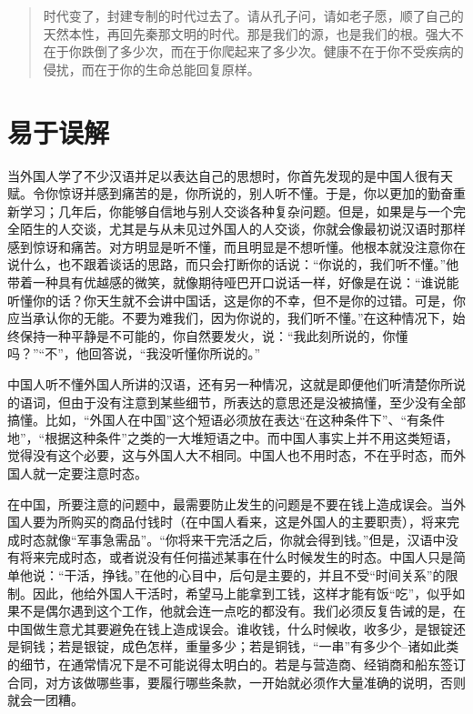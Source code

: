 \documentclass[12pt,oneside]{book}
\begin{document}
\begin{common-format}
\begin{quotation}
时代变了，封建专制的时代过去了。请从孔子问，请如老子愿，顺了自己的天然本性，再回先秦那文明的时代。那是我们的源，也是我们的根。强大不在于你跌倒了多少次，而在于你爬起来了多少次。健康不在于你不受疾病的侵扰，而在于你的生命总能回复原样。
\end{quotation}


\chapter{易于误解}
当外国人学了不少汉语并足以表达自己的思想时，你首先发现的是中国人很有天赋。令你惊讶并感到痛苦的是，你所说的，别人听不懂。于是，你以更加的勤奋重新学习；几年后，你能够自信地与别人交谈各种复杂问题。但是，如果是与一个完全陌生的人交谈，尤其是与从未见过外国人的人交谈，你就会像最初说汉语时那样感到惊讶和痛苦。对方明显是听不懂，而且明显是不想听懂。他根本就没注意你在说什么，也不跟着谈话的思路，而只会打断你的话说：“你说的，我们听不懂。”他带着一种具有优越感的微笑，就像期待哑巴开口说话一样，好像是在说：“谁说能听懂你的话？你天生就不会讲中国话，这是你的不幸，但不是你的过错。可是，你应当承认你的无能。不要为难我们，因为你说的，我们听不懂。”在这种情况下，始终保持一种平静是不可能的，你自然要发火，说：“我此刻所说的，你懂吗？”“不”，他回答说，“我没听懂你所说的。” 

中国人听不懂外国人所讲的汉语，还有另一种情况，这就是即便他们听清楚你所说的语词，但由于没有注意到某些细节，所表达的意思还是没被搞懂，至少没有全部搞懂。比如，“外国人在中国”这个短语必须放在表达“在这种条件下”、“有条件地”，“根据这种条件”之类的一大堆短语之中。而中国人事实上并不用这类短语，觉得没有这个必要，这与外国人大不相同。中国人也不用时态，不在乎时态，而外国人就一定要注意时态。 

在中国，所要注意的问题中，最需要防止发生的问题是不要在钱上造成误会。当外国人要为所购买的商品付钱时（在中国人看来，这是外国人的主要职责），将来完成时态就像“军事急需品”。“你将来干完活之后，你就会得到钱。”但是，汉语中没有将来完成时态，或者说没有任何描述某事在什么时候发生的时态。中国人只是简单他说：“干活，挣钱。”在他的心目中，后句是主要的，并且不受“时间关系”的限制。因此，他给外国人干活时，希望马上能拿到工钱，这样才能有饭“吃”，似乎如果不是偶尔遇到这个工作，他就会连一点吃的都没有。我们必须反复告诫的是，在中国做生意尤其要避免在钱上造成误会。谁收钱，什么时候收，收多少，是银锭还是铜钱；若是银锭，成色怎样，重量多少；若是铜钱，“一串”有多少个--诸如此类的细节，在通常情况下是不可能说得太明白的。若是与营造商、经销商和船东签订合同，对方该做哪些事，要履行哪些条款，一开始就必须作大量准确的说明，否则就会一团糟。 


\end{common-format}
\end{document}

